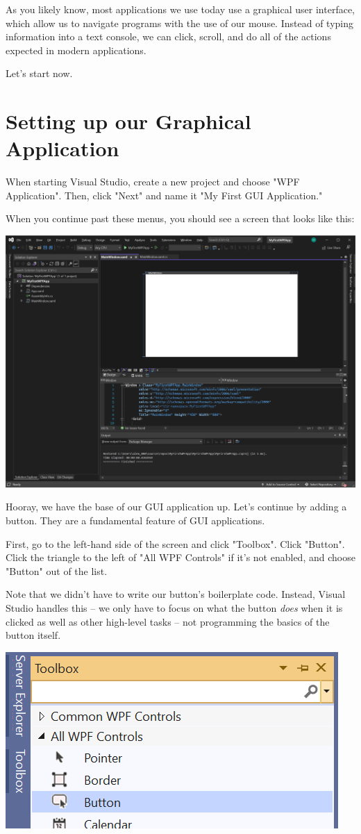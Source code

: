 \documentclass[oneside, openany] {book}
\begin{document}
As you likely know, most applications we use today use a graphical user interface, which allow us to navigate programs with the use of our mouse. Instead of typing information into a text console, we can click, scroll, and do all of the actions expected in modern applications.

Let's start now.
\section{Setting up our Graphical Application}
When starting Visual Studio, create a new project and choose "WPF Application". Then, click "Next" and name it "My First GUI Application."

When you continue past these menus, you should see a screen that looks like this:


\includegraphics[scale = 0.2]{WPF}

Hooray, we have the base of our GUI application up. Let's continue by adding a button. They are a fundamental feature of GUI applications.

First, go to the left-hand side of the screen and click "Toolbox". Click "Button". Click the triangle to the left of "All WPF Controls" if it's not enabled, and choose "Button" out of the list.

Note that we didn't have to write our button's boilerplate code. Instead, Visual Studio handles this -- we only have to focus on what the button \emph{does} when it is clicked as well as other high-level tasks -- not programming the basics of the button itself.


\includegraphics[scale = 1]{FindingButton}
\end{document}
